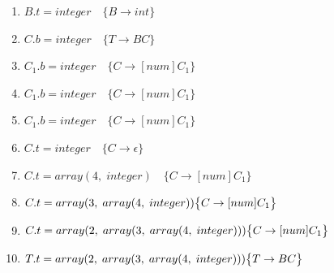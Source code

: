 \documentclass[11pt]{article}
\begin{document}
\begin{center}
\begin{minipage}[t]{\linewidth}
\begin{multicols}{2}
\begin{enumerate}
        \item $B.t = integer \quad \big \{B \rightarrow int\big\}$ 
        \item $C.b = integer \quad \big \{T \rightarrow BC\big\}$
        \item $C_1.b = integer \quad \big \{C \rightarrow [num]C_1\big\}$
        \item $C_1.b = integer \quad \big \{C \rightarrow [num]C_1\big\}$
        \item $C_1.b = integer \quad \big \{C \rightarrow [num]C_1\big\}$
        \item $C.t = integer \quad \big \{C \rightarrow \epsilon\big\}$
        \item $C.t = array(4,\; integer)\quad \big \{C \rightarrow [num]C_1\big\}$
        \item $C.t = array(3,\;array(4,\;integer)) \newline \big \{C \rightarrow [num]C_1\big\}$
        \item $C.t = array(2,\;array(3,\;array(4,\;integer))) \newline \big \{C \rightarrow [num]C_1\big\}$
        \item $T.t = array(2,\;array(3,\;array(4,\;integer))) \newline \big \{T \rightarrow BC \big\}$
      \end{enumerate}
    \end{multicols}
  \end{minipage}
\end{center}
\end{document}
